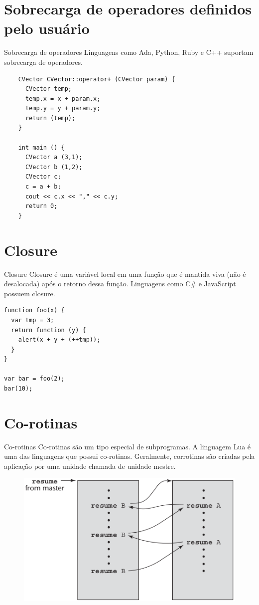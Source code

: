 \section{Sobrecarga de operadores definidos pelo usuário}
\begin{frame}[fragile]{Sobrecarga de operadores}
Linguagens como Ada, Python, Ruby e C++ suportam sobrecarga de operadores. 
\begin{lstlisting}
	CVector CVector::operator+ (CVector param) {
	  CVector temp;
	  temp.x = x + param.x;
	  temp.y = y + param.y;
	  return (temp);
	}

	int main () {
	  CVector a (3,1);
	  CVector b (1,2);
	  CVector c;
	  c = a + b;
	  cout << c.x << "," << c.y;
	  return 0;
	}
\end{lstlisting}
\end{frame}

\section{Closure} 
\begin{frame}[fragile]{Closure}
Closure é uma variável local em uma função que é mantida viva (não é desalocada) após o retorno dessa função. Linguagens como C\# e JavaScript possuem closure. 
\begin{lstlisting}
function foo(x) {
  var tmp = 3;
  return function (y) {
    alert(x + y + (++tmp));
  }
}

var bar = foo(2);
bar(10); 
\end{lstlisting}
\end{frame}

\section{Co-rotinas} 
\begin{frame}[fragile]{Co-rotinas}
Co-rotinas são um tipo especial de subprogramas. A linguagem Lua é uma das linguagens que possui co-rotinas. Geralmente, corrotinas são criadas pela aplicação por uma unidade chamada de unidade mestre.
\begin{figure}[ht!]
 \centering
 \includegraphics[scale=0.5]{./imgs/coroutines.png}
\label{co-rotinas}
\end{figure}
\end{frame}

